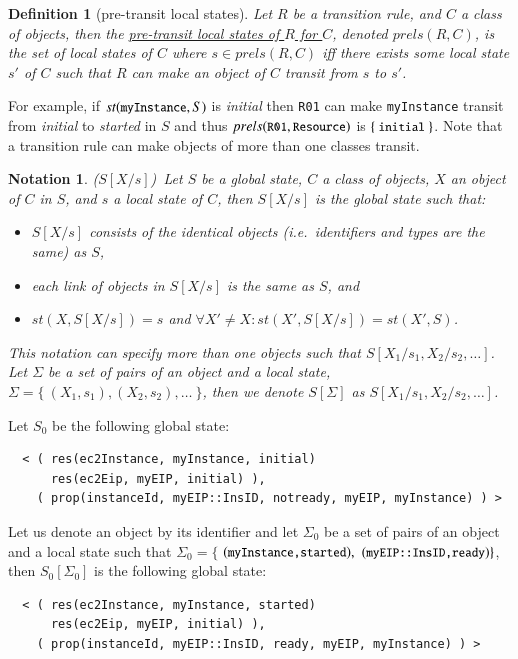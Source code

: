 \documentclass[12pt]{report}
\newtheorem{notation}{Notation}
\newtheorem{definition}{Definition}
\newcommand{\mbstt}[1]{\mbox{\small{\tt {#1}}}}
\newcommand{\stt}[1]{{\small{\tt {#1}}}}
\newcommand{\ul}{\underline}
\begin{document}
\begin{definition}[pre-transit local states]
Let $R$ be a transition rule, and $C$ a class of objects, then
the \ul{pre-transit local states of $R$ for $C$}, denoted
\ul{$prels(R,C)$}, is the set of local states of $C$ where $s \in
prels(R,C)$ iff there exists some local state $s'$ of $C$ such that
$R$ can make an object of $C$ transit from $s$ to $s'$.
\end{definition}
For example, if $st(\mbstt{myInstance},S)$ is {\it initial} then
\stt{R01} can make \stt{myInstance} transit from {\it initial} to {\it
  started} in $S$ and thus $prels(\mbstt{R01},\mbstt{Resource})$ is
$\{~\mbstt{initial}~\}$. Note that a transition rule can make objects
of more than one classes transit.

\begin{notation}($S[X/s]$)\
Let $S$ be a global state, $C$ a class of objects, $X$ an object
of $C$ in $S$, and $s$ a local state of $C$, then
\ul{$S[X/s]$} is the global state such that:
\begin{itemize}
\item $S[X/s]$ consists of the identical objects (i.e.\ identifiers and
  types are the same) as $S$,
\item each link of objects in $S[X/s]$ is the same as $S$, and
\item $st(X,S[X/s])=s$ and $\forall X'\ne X:st(X',S[X/s])=st(X',S)$.
\end{itemize}
This notation can specify more than one objects such that
\ul{$S[X_1/s_1,X_2/s_2,\dots]$}.  Let $\Sigma$ be a set of pairs of
an object and a local state, $\Sigma = \{~ (X_1,s_1), (X_2,s_2), \dots~\}$,
then we denote \ul{$S[\Sigma]$} as $S[X_1/s_1,X_2/s_2,\dots]$.
\end{notation}
Let $\mathit{S_0}$ be the following global state:
\small
\begin{verbatim}
  < ( res(ec2Instance, myInstance, initial)
      res(ec2Eip, myEIP, initial) ),
    ( prop(instanceId, myEIP::InsID, notready, myEIP, myInstance) ) >
\end{verbatim}
\normalsize
Let us denote an object by its identifier and let $\Sigma_0$ be a set
of pairs of an object and a local state such that $\Sigma_0=\{$
$(\mbstt{myInstance,started}),$ $(\mbstt{myEIP::InsID,ready})\}$, then
$\mathit{S_0}[\Sigma_0]$ is the following global state:
\small
\begin{verbatim}
  < ( res(ec2Instance, myInstance, started)
      res(ec2Eip, myEIP, initial) ),
    ( prop(instanceId, myEIP::InsID, ready, myEIP, myInstance) ) >
\end{verbatim}
\normalsize
\end{document}
